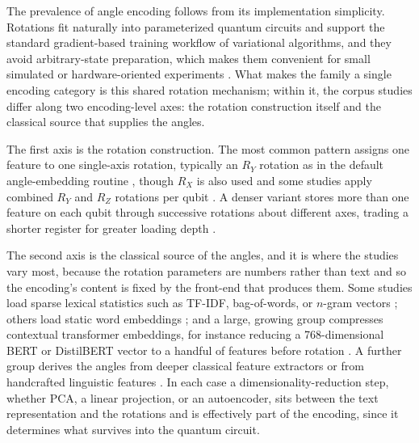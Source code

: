 \documentclass{ieeeaccess}
\begin{document}
The prevalence of angle encoding follows from its implementation simplicity. Rotations fit naturally into parameterized quantum circuits and support the standard gradient-based training workflow of variational algorithms, and they avoid arbitrary-state preparation, which makes them convenient for small simulated or hardware-oriented experiments \cite{mitarai2018quantum,schuld2019evaluating}. What makes the family a single encoding category is this shared rotation mechanism; within it, the corpus studies differ along two encoding-level axes: the rotation construction itself and the classical source that supplies the angles.

The first axis is the rotation construction. The most common pattern assigns one feature to one single-axis rotation, typically an $R_Y$ rotation as in the default angle-embedding routine \cite{ruskanda_evaluating_2025,kesiku_quantum_2025,diaz-ortiz_strongly_2024}, though $R_X$ is also used \cite{day_qnet_2023,zhou_new_2022,tiwari_quantum_2024} and some studies apply combined $R_Y$ and $R_Z$ rotations per qubit \cite{stein_applying_2023}. A denser variant stores more than one feature on each qubit through successive rotations about different axes, trading a shorter register for greater loading depth \cite{kesiku_unlocking_2026}.

The second axis is the classical source of the angles, and it is where the studies vary most, because the rotation parameters are numbers rather than text and so the encoding's content is fixed by the front-end that produces them. Some studies load sparse lexical statistics such as TF-IDF, bag-of-words, or $n$-gram vectors \cite{boopalamani_quantum-enhanced_2025,payares_quantum_2023,kabir_qtopic_2026}; others load static word embeddings \cite{di_sipio_dawn_2022,diaz-ortiz_strongly_2024,ohno_quantum_2025}; and a large, growing group compresses contextual transformer embeddings, for instance reducing a 768-dimensional BERT or DistilBERT vector to a handful of features before rotation \cite{ahmad_hybrid_2023,kumar_hybrid_2026,suleiman_hdqe_2026,yu_application_2024}. A further group derives the angles from deeper classical feature extractors or from handcrafted linguistic features \cite{rezaei_hybrid_2026,mukesh_qvila_2024,mompelat_compact_2026}. In each case a dimensionality-reduction step, whether PCA, a linear projection, or an autoencoder, sits between the text representation and the rotations and is effectively part of the encoding, since it determines what survives into the quantum circuit.
\end{document}
